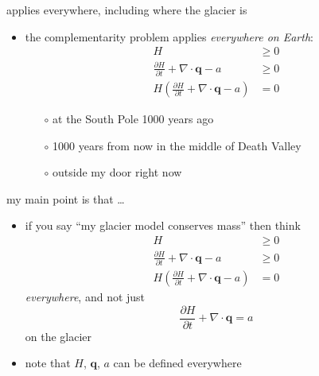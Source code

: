 \documentclass[10pt,hyperref,dvipsnames]{beamer}
\newcommand{\bq}{\mathbf{q}}
\newcommand{\Div}{\nabla\cdot}
\begin{document}
\begin{frame}{applies everywhere, including where the glacier is}
\begin{itemize}
\item the complementarity problem applies \emph{everywhere on Earth}:
\begin{align*}
H &\ge 0 \\
\frac{\partial H}{\partial t} + \Div \bq - a &\ge 0 \\
H \left(\frac{\partial H}{\partial t} + \Div \bq - a\right) &= 0
\end{align*}
    \begin{itemize}
    \item[$\circ$] at the South Pole 1000 years ago
    \item[$\circ$] 1000 years from now in the middle of Death Valley
    \item[$\circ$] outside my door right now
    \end{itemize}

\bigskip
{}
\end{itemize}
\end{frame}


\begin{frame}{my main point is that \dots}
\begin{itemize}
\item if you say ``my glacier model conserves mass'' then think
\begin{align*}
H &\ge 0 \\
\frac{\partial H}{\partial t} + \Div \bq - a &\ge 0 \\
H \left(\frac{\partial H}{\partial t} + \Div \bq - a\right) &= 0
\end{align*}
\emph{everywhere}, and not just
    $$\frac{\partial H}{\partial t} + \Div \bq = a$$
on the glacier

\medskip
\item<2> note that $H$, $\bq$, $a$ can be defined everywhere
\end{itemize}
\end{frame}
\end{document}
